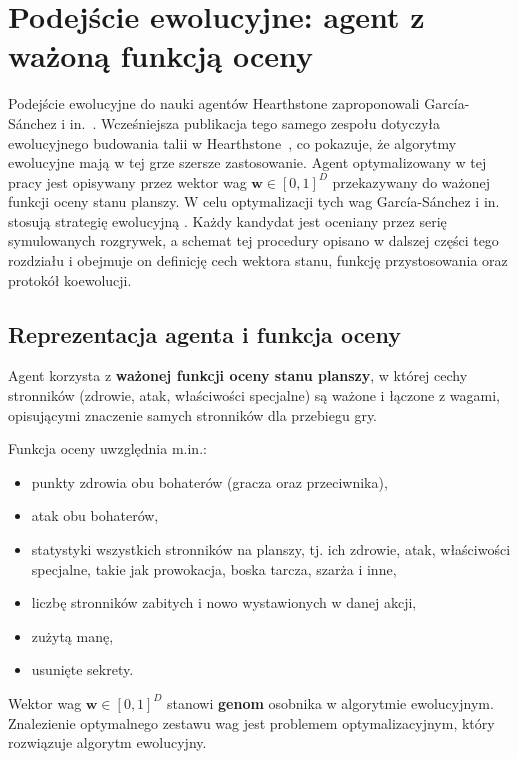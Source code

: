 \section{Podejście ewolucyjne: agent z ważoną funkcją oceny} \label{sec:baseline}

Podejście ewolucyjne do nauki agentów Hearthstone zaproponowali García-Sánchez i in.~\cite{sanchez2020}. Wcześniejsza publikacja tego samego zespołu dotyczyła ewolucyjnego budowania talii w Hearthstone~\cite{sanchez2018}, co pokazuje, że algorytmy ewolucyjne mają w tej grze szersze zastosowanie. Agent optymalizowany w tej pracy jest opisywany przez wektor wag $\mathbf{w} \in [0, 1]^D$ przekazywany do ważonej funkcji oceny stanu planszy. W celu optymalizacji tych wag García-Sánchez i in. stosują strategię ewolucyjną \cite{sanchez2020}. Każdy kandydat jest oceniany przez serię symulowanych rozgrywek, a schemat tej procedury opisano w dalszej części tego rozdziału i obejmuje on definicję cech wektora stanu, funkcję przystosowania oraz protokół koewolucji.

\subsection{Reprezentacja agenta i funkcja oceny}
Agent korzysta z \textbf{ważonej funkcji oceny stanu planszy}, w której cechy stronników (zdrowie, atak, właściwości specjalne) są ważone i łączone z wagami, opisującymi znaczenie samych stronników dla przebiegu gry.

Funkcja oceny uwzględnia m.in.:
\begin{itemize}
\item punkty zdrowia obu bohaterów (gracza oraz przeciwnika),
\item atak obu bohaterów,
\item statystyki wszystkich stronników na planszy, tj. ich zdrowie, atak, właściwości specjalne, takie jak prowokacja, boska tarcza, szarża i inne,
\item liczbę stronników zabitych i nowo wystawionych w danej akcji,
\item zużytą manę,
\item usunięte sekrety.
\end{itemize}

Wektor wag $\mathbf{w} \in [0, 1]^D$ stanowi \textbf{genom} osobnika w algorytmie ewolucyjnym. Znalezienie optymalnego zestawu wag jest problemem optymalizacyjnym, który rozwiązuje algorytm ewolucyjny.

